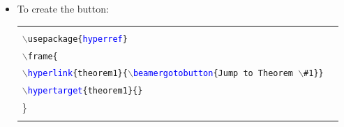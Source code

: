 \documentclass[compress,red]{beamer}
\begin{document}
{\begin{itemize}
	OR, \texttt{$\backslash$label\{theorem1\}} \\\vspace{.1cm}
	\item \footnotesize To create the button:\\\vspace{.1cm}
\tiny
	\begin{tabular}{|ll|}
	\hline
	&\\
	\texttt{$\backslash$usepackage\{\textcolor{Blue}{hyperref}\}} &\\
	\texttt{$\backslash$frame\{} &\\
	\texttt{$\backslash$\textcolor{Blue}{hyperlink}\{theorem1\}\{$\backslash$\textcolor{Blue}{beamergotobutton}\{Jump to Theorem $\backslash$\#1\}\}} &\\
	\texttt{$\backslash$\textcolor{Blue}{hypertarget}\{theorem1\}\{\}} &\\
	\}&\\
	&\\\hline 
	\end{tabular}
\end{itemize}
}

\end{document}
